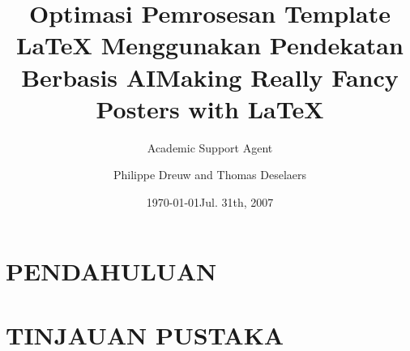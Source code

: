 \documentclass{beamer}
\title{Optimasi Pemrosesan Template LaTeX Menggunakan Pendekatan Berbasis AI}
\author{Academic Support Agent}
\date{\today}
\begin{document}
\maketitle

\begin{abstract}

\end{abstract}

\chapter{PENDAHULUAN}


\chapter{TINJAUAN PUSTAKA}


  {
  }
  \usepackage{times}
  \usepackage{amsmath,amsthm, amssymb, latexsym}
  \boldmath
  \usepackage[english]{babel}
  \usepackage[latin1]{inputenc}
  \usepackage[orientation=portrait,size=a0,scale=1.4,debug]{beamerposter}

  \graphicspath{{figures/}}
  \title[Fancy Posters]{Making Really Fancy Posters with \LaTeX}
  \author[Dreuw \& Deselaers]{Philippe Dreuw and Thomas Deselaers}
  \date{Jul. 31th, 2007}
\end{document}
